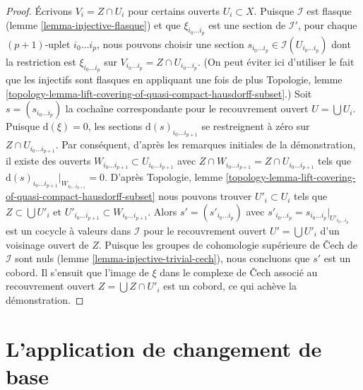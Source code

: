 \begin{proof}
Écrivons $V_i = Z \cap U_i$ pour certains ouverts $U_i \subset X$. Puisque $\mathcal{I}$ est flasque (lemme \ref{lemma-injective-flasque}) et que $\xi_{i_0 \ldots i_p}$ est une section de $\mathcal{I}'$,
pour chaque $(p + 1)$-uplet $i_0 \ldots i_p$, nous pouvons choisir une section $s_{i_0 \ldots i_p} \in \mathcal{I}(U_{i_0 \ldots i_p})$
dont la restriction est $\xi_{i_0 \ldots i_p}$ sur
$V_{i_0 \ldots i_p} = Z \cap U_{i_0 \ldots i_p}$. (On peut éviter ici d'utiliser le fait que les injectifs sont flasques en appliquant une fois de plus Topologie, lemme
\ref{topology-lemma-lift-covering-of-quasi-compact-hausdorff-subset}.) Soit $s = (s_{i_0 \ldots i_p})$ la cochaîne correspondante pour le recouvrement ouvert $U = \bigcup U_i$. Puisque $\text{d}(\xi) = 0$, les sections
$\text{d}(s)_{i_0 \ldots i_{p + 1}}$ se restreignent à zéro sur $Z \cap U_{i_0 \ldots i_{p + 1}}$. Par conséquent, d'après les remarques initiales de la démonstration, il existe des ouverts
$W_{i_0 \ldots i_{p + 1}} \subset U_{i_0 \ldots i_{p + 1}}$
avec $Z \cap W_{i_0 \ldots i_{p + 1}} = Z \cap U_{i_0 \ldots i_{p + 1}}$
tels que $\text{d}(s)_{i_0 \ldots i_{p + 1}}|_{W_{i_0 \ldots i_{p + 1}}} = 0$. D'après Topologie, lemme
\ref{topology-lemma-lift-covering-of-quasi-compact-hausdorff-subset}
nous pouvons trouver $U'_i \subset U_i$ tels que $Z \subset \bigcup U'_i$
et $U'_{i_0 \ldots i_{p + 1}} \subset W_{i_0 \ldots i_{p + 1}}$. Alors $s' = (s'_{i_0 \ldots i_p})$ avec
$s'_{i_0 \ldots i_p} = s_{i_0 \ldots i_p}|_{U'_{i_0 \ldots i_p}}$
est un cocycle à valeurs dans $\mathcal{I}$ pour le recouvrement ouvert
$U' = \bigcup U'_i$ d'un voisinage ouvert de $Z$. Puisque les groupes de cohomologie supérieure de {\v C}ech de $\mathcal{I}$ sont nuls (lemme \ref{lemma-injective-trivial-cech}), nous concluons que $s'$ est un cobord. Il s'ensuit que l'image de
$\xi$ dans le complexe de {\v C}ech associé au recouvrement ouvert
$Z = \bigcup Z \cap U'_i$ est un cobord, ce qui achève la démonstration.

\end{proof}





\section{L'application de changement de base}

\label{section-base-change-map}

\noindent


